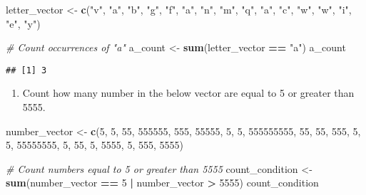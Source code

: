 \documentclass[
]{article}
\newenvironment{Shaded}{\begin{snugshade}}{\end{snugshade}}
\newcommand{\CommentTok}[1]{\textcolor[rgb]{0.56,0.35,0.01}{\textit{#1}}}
\newcommand{\DecValTok}[1]{\textcolor[rgb]{0.00,0.00,0.81}{#1}}
\newcommand{\FunctionTok}[1]{\textcolor[rgb]{0.13,0.29,0.53}{\textbf{#1}}}
\newcommand{\NormalTok}[1]{#1}
\newcommand{\OtherTok}[1]{\textcolor[rgb]{0.56,0.35,0.01}{#1}}
\newcommand{\SpecialCharTok}[1]{\textcolor[rgb]{0.81,0.36,0.00}{\textbf{#1}}}
\newcommand{\StringTok}[1]{\textcolor[rgb]{0.31,0.60,0.02}{#1}}
\providecommand{\tightlist}{%
  \setlength{\itemsep}{0pt}\setlength{\parskip}{0pt}}
\begin{document}
\begin{Shaded}
\begin{Highlighting}[]
\NormalTok{letter\_vector }\OtherTok{\textless{}{-}} \FunctionTok{c}\NormalTok{(}\StringTok{"v"}\NormalTok{, }\StringTok{"a"}\NormalTok{, }\StringTok{"b"}\NormalTok{, }\StringTok{"g"}\NormalTok{, }\StringTok{"f"}\NormalTok{, }\StringTok{"a"}\NormalTok{, }\StringTok{"n"}\NormalTok{, }\StringTok{"m"}\NormalTok{, }\StringTok{"q"}\NormalTok{, }\StringTok{"a"}\NormalTok{, }\StringTok{"c"}\NormalTok{, }\StringTok{"w"}\NormalTok{, }\StringTok{"w"}\NormalTok{, }\StringTok{"i"}\NormalTok{, }\StringTok{"e"}\NormalTok{, }\StringTok{"y"}\NormalTok{)}

\CommentTok{\# Count occurrences of "a"}
\NormalTok{a\_count }\OtherTok{\textless{}{-}} \FunctionTok{sum}\NormalTok{(letter\_vector }\SpecialCharTok{==} \StringTok{"a"}\NormalTok{)}
\NormalTok{a\_count}
\end{Highlighting}
\end{Shaded}

\begin{verbatim}
## [1] 3
\end{verbatim}

\begin{enumerate}
\def\labelenumi{\arabic{enumi})}
\setcounter{enumi}{7}
\tightlist
\item
  Count how many number in the below vector are equal to 5 or greater
  than 5555.
\end{enumerate}

\begin{Shaded}
\begin{Highlighting}[]
\NormalTok{number\_vector }\OtherTok{\textless{}{-}} \FunctionTok{c}\NormalTok{(}\DecValTok{5}\NormalTok{, }\DecValTok{5}\NormalTok{, }\DecValTok{55}\NormalTok{, }\DecValTok{555555}\NormalTok{, }\DecValTok{555}\NormalTok{, }\DecValTok{55555}\NormalTok{, }\DecValTok{5}\NormalTok{, }\DecValTok{5}\NormalTok{, }\DecValTok{555555555}\NormalTok{, }\DecValTok{55}\NormalTok{, }\DecValTok{55}\NormalTok{, }\DecValTok{555}\NormalTok{, }\DecValTok{5}\NormalTok{, }\DecValTok{5}\NormalTok{, }\DecValTok{55555555}\NormalTok{, }\DecValTok{5}\NormalTok{, }\DecValTok{55}\NormalTok{, }\DecValTok{5}\NormalTok{, }\DecValTok{5555}\NormalTok{, }\DecValTok{5}\NormalTok{, }\DecValTok{555}\NormalTok{, }\DecValTok{5555}\NormalTok{)}

\CommentTok{\# Count numbers equal to 5 or greater than 5555}
\NormalTok{count\_condition }\OtherTok{\textless{}{-}} \FunctionTok{sum}\NormalTok{(number\_vector }\SpecialCharTok{==} \DecValTok{5} \SpecialCharTok{|}\NormalTok{ number\_vector }\SpecialCharTok{\textgreater{}} \DecValTok{5555}\NormalTok{)}
\NormalTok{count\_condition}
\end{Highlighting}
\end{Shaded}
\end{document}

